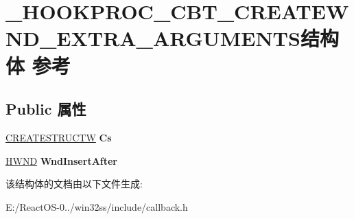 \hypertarget{struct___h_o_o_k_p_r_o_c___c_b_t___c_r_e_a_t_e_w_n_d___e_x_t_r_a___a_r_g_u_m_e_n_t_s}{}\section{\+\_\+\+H\+O\+O\+K\+P\+R\+O\+C\+\_\+\+C\+B\+T\+\_\+\+C\+R\+E\+A\+T\+E\+W\+N\+D\+\_\+\+E\+X\+T\+R\+A\+\_\+\+A\+R\+G\+U\+M\+E\+N\+T\+S结构体 参考}
\label{struct___h_o_o_k_p_r_o_c___c_b_t___c_r_e_a_t_e_w_n_d___e_x_t_r_a___a_r_g_u_m_e_n_t_s}
\subsection*{Public 属性}
\begin{DoxyCompactItemize}
\item 
\mbox{\label{struct___h_o_o_k_p_r_o_c___c_b_t___c_r_e_a_t_e_w_n_d___e_x_t_r_a___a_r_g_u_m_e_n_t_s_ab630032b810f1a487dcf1921694ab8f3}} 
\hyperlink{structtag_c_r_e_a_t_e_s_t_r_u_c_t_w}{C\+R\+E\+A\+T\+E\+S\+T\+R\+U\+C\+TW} {\bfseries Cs}
\item 
\mbox{\label{struct___h_o_o_k_p_r_o_c___c_b_t___c_r_e_a_t_e_w_n_d___e_x_t_r_a___a_r_g_u_m_e_n_t_s_a105625b85288b363f58ffae8368d9644}} 
\hyperlink{interfacevoid}{H\+W\+ND} {\bfseries Wnd\+Insert\+After}
\end{DoxyCompactItemize}


该结构体的文档由以下文件生成\+:\begin{DoxyCompactItemize}
\item 
E\+:/\+React\+O\+S-\/0../win32ss/include/callback.\+h\end{DoxyCompactItemize}
